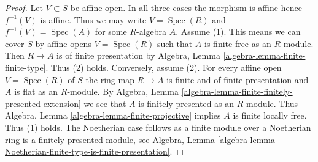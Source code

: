 \documentclass[10pt,a4paper]{amsart}
\theoremstyle{plain}
\theoremstyle{definition}
\theoremstyle{remark}
\numberwithin{equation}{subsection}
\def\Spec{\mathop{\mathrm{Spec}}}
\begin{document}
\begin{proof}
Let $V \subset S$ be affine open. In all three cases
the morphism is affine hence $f^{-1}(V)$ is affine.
Thus we may write $V = \Spec(R)$ and $f^{-1}(V) = \Spec(A)$
for some $R$-algebra $A$.
Assume (1). This means we can cover $S$ by affine opens
$V = \Spec(R)$ such that $A$ is finite free as an $R$-module.
Then $R \to A$ is of finite presentation by
Algebra, Lemma \ref{algebra-lemma-finite-finite-type}.
Thus (2) holds. Conversely, assume (2).
For every affine open $V = \Spec(R)$ of $S$ the ring map
$R \to A$ is finite and of finite presentation and $A$ is flat
as an $R$-module. By
Algebra, Lemma \ref{algebra-lemma-finite-finitely-presented-extension}
we see that $A$ is finitely presented as an $R$-module.
Thus Algebra, Lemma \ref{algebra-lemma-finite-projective}
implies $A$ is finite locally free. Thus (1) holds.
The Noetherian case follows as a finite module over a Noetherian ring
is a finitely presented module, see Algebra,
Lemma \ref{algebra-lemma-Noetherian-finite-type-is-finite-presentation}.
\end{proof}
\end{document}
